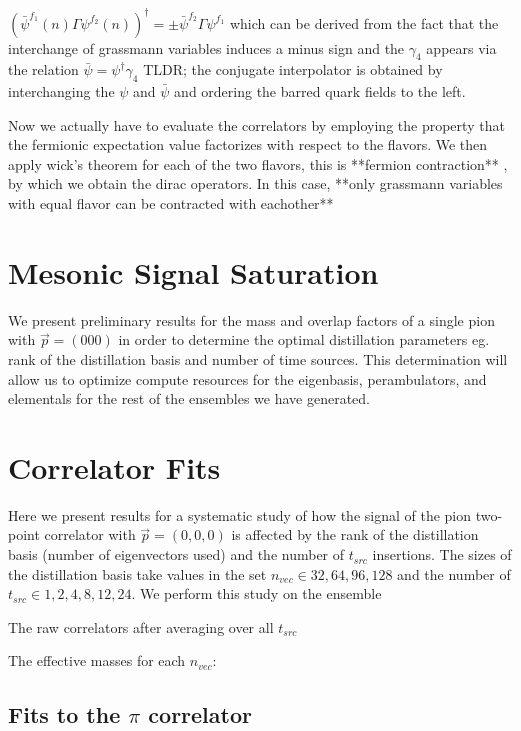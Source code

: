 $(\bar{\psi}^{f_1}(n)\Gamma\psi^{f_2}(n))^{\dagger} = \pm \bar{\psi}^{f_2} \Gamma \psi^{f_1}$
which can be derived from the fact that the interchange of grassmann variables induces a minus sign and the $\gamma_4$ appears via the relation $\bar{\psi} = \psi^{\dagger}\gamma_4$
TLDR; the conjugate interpolator is obtained by interchanging the $\psi$ and $\bar{\psi}$ and ordering the barred quark fields to the left. 

Now we actually have to evaluate the correlators by employing the property that the fermionic expectation value factorizes with respect to the flavors. We then apply wick's theorem for each of the two flavors, this is **fermion contraction** , by which we obtain the dirac operators. In this case, **only grassmann variables with equal flavor can be contracted with eachother** 

\section{Mesonic Signal Saturation}

We present preliminary results for the mass and overlap factors of a single pion with $\vec{p} = (000)$ in order to determine the optimal distillation parameters eg. rank of the distillation basis and number of time sources. This determination will allow us to optimize compute resources for the eigenbasis, perambulators, and elementals for the rest of the ensembles  we have generated. 
\section{Correlator Fits}

Here we present results for a systematic study of how the signal of the pion two-point correlator with $\vec{p}=(0,0,0)$ is affected by the rank of the distillation basis (number of eigenvectors used) and the number of $t_{src}$ insertions. The sizes of the distillation basis take values in the set $n_{vec}\in {32,64,96,128}$ and the number of $t_{src} \in {1,2,4,8,12,24}$. We perform this study on the ensemble 

The raw correlators after averaging over all $t_{src}$ 

The effective masses for each $n_{vec}$: 

\subsection{Fits to the $\pi$ correlator}

